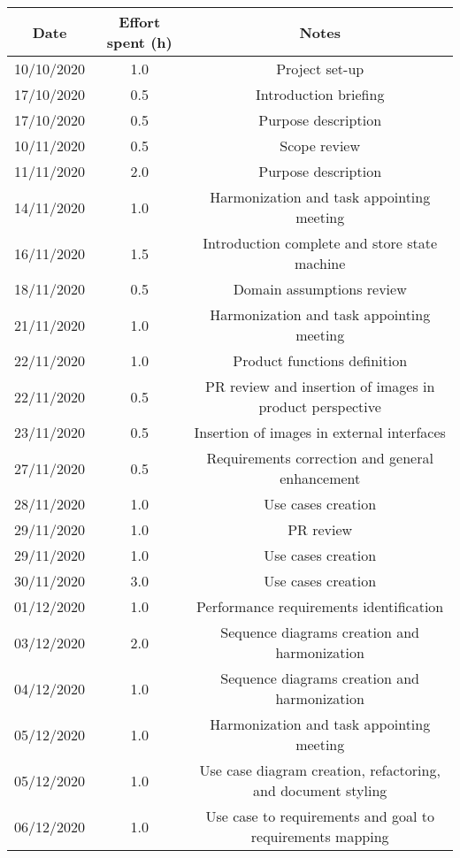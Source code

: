 \documentclass[../../main.tex]{subfiles}
\begin{document}
    \begin{center}
        \begin{tabular}{|c| |c| |c|} 
            \hline
            Date & Effort spent (h) & Notes\\ [0.5ex] 
            \hline\hline
            10/10/2020 & 1.0 & Project set-up\\ 
            17/10/2020 & 0.5 & Introduction briefing\\ 
            17/10/2020 & 0.5 & Purpose description\\ 
            10/11/2020 & 0.5 & Scope review\\
            11/11/2020 & 2.0 & Purpose description\\
            14/11/2020 & 1.0 & Harmonization and task appointing meeting\\
            16/11/2020 & 1.5 & Introduction complete and store state machine\\
            18/11/2020 & 0.5 & Domain assumptions review\\
            21/11/2020 & 1.0 & Harmonization and task appointing meeting\\
            22/11/2020 & 1.0 & Product functions definition\\
            22/11/2020 & 0.5 & PR review and insertion of images in product perspective\\
            23/11/2020 & 0.5 & Insertion of images in external interfaces\\
            27/11/2020 & 0.5 & Requirements correction and general enhancement\\
            28/11/2020 & 1.0 & Use cases creation\\
            29/11/2020 & 1.0 & PR review\\
            29/11/2020 & 1.0 & Use cases creation\\
            30/11/2020 & 3.0 & Use cases creation\\
            01/12/2020 & 1.0 & Performance requirements identification\\
            03/12/2020 & 2.0 & Sequence diagrams creation and harmonization\\
            04/12/2020 & 1.0 & Sequence diagrams creation and harmonization\\
            05/12/2020 & 1.0 & Harmonization and task appointing meeting\\
            05/12/2020 & 1.0 & Use case diagram creation, refactoring, and document styling\\
            06/12/2020 & 1.0 & Use case to requirements and goal to requirements mapping\\
            \hline
        \end{tabular}
    \end{center}
\end{document}
